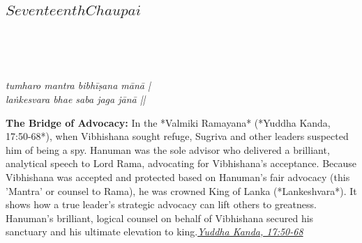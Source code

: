 
\newpage

\subsection*{ \(Seventeenth Chaupai\)}

\begin{minipage}[t]{0.55\textwidth}
\vspace{0pt}

{\large \linespread{1.5}\selectfont
{}\\
\par}

\vspace{0.5em}

{\large \linespread{1.5}\selectfont
{}\\
\par}

\vspace{0.5em}

{\large \linespread{1.3}\selectfont
\textit{tumharo mantra bibhīṣana mānā |}\\
\textit{laṅkesvara bhae saba jaga jānā ||}
\par}
\end{minipage}%
\hfill
\begin{minipage}[t]{0.42\textwidth}
\vspace{0pt}
\begin{tcolorbox}[anchorbox]
\textbf{The Bridge of Advocacy:} In the *Valmiki Ramayana* (*Yuddha Kanda, 17:50-68*), when Vibhishana sought refuge, Sugriva and other leaders suspected him of being a spy. Hanuman was the sole advisor who delivered a brilliant, analytical speech to Lord Rama, advocating for Vibhishana's acceptance. Because Vibhishana was accepted and protected based on Hanuman's fair advocacy (this 'Mantra' or counsel to Rama), he was crowned King of Lanka (*Lankeshvara*). It shows how a true leader's strategic advocacy can lift others to greatness.
\vspace{0.5em}\newline Hanuman's brilliant, logical counsel on behalf of Vibhishana secured his sanctuary and his ultimate elevation to king.\newline\null\hfill\href{https://www.valmiki.iitk.ac.in/sloka?field_kanda_tid=6&language=dv&field_sarga_value=17}{\textit{Yuddha Kanda, 17:50-68}}
\end{tcolorbox}
\end{minipage}

